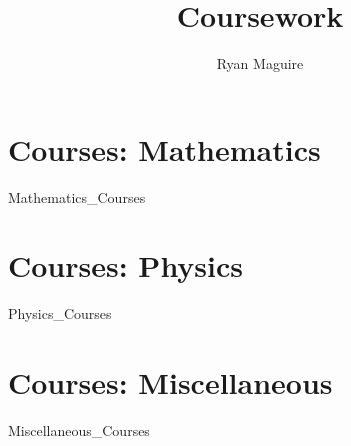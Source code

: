 \documentclass[crop=false,class=book,oneside]{standalone}
\begin{document}
    \newif\ifcourses
    \ifx\ifmain\undefined
        \title{Coursework}
        \author{Ryan Maguire}
        \date{\vspace{-5ex}}
        \maketitle
        \tableofcontents
        \listoffigures
        \listoftables
        \clearpage
    \fi
    \part{Courses: Mathematics}
        {Mathematics_Courses}
    \part{Courses: Physics}
        {Physics_Courses}
    \part{Courses: Miscellaneous}
        {Miscellaneous_Courses}
\end{document}
